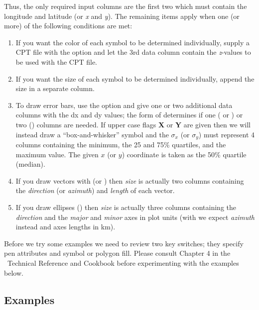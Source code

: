 \documentclass{report}
\begin{document}
Thus, the only required input columns are the first two which must contain the
longitude and latitude (or \emph{x} and \emph{y}).  The remaining items
apply when one (or more) of the following conditions are met:

\begin{enumerate}

\item If you want the color of each symbol to be determined individually,
supply a CPT file with the  option and let the 3rd data column
contain the \emph{z}-values to be used with the CPT file.

\item If you want the size of each symbol to be determined individually,
append the size in a separate column.

\item To draw error bars, use the  option and give one or two
additional data columns with the \PM dx and \PM dy values; the form of
 determines if one ( or ) or two ()
columns are needed.  If upper case flags \textbf{X} or \textbf{Y} are given then
we will instead draw a ``box-and-whisker'' symbol and the $\sigma_x$ (or
$\sigma_y$) must represent 4 columns containing the minimum, the 25 and 75\%
quartiles, and the maximum value.  The given $x$ (or $y$) coordinate is taken as the 50\%
quartile (median).

\item If you draw vectors with  (or ) then \emph{size} is
actually two columns containing the \emph{direction} (or \emph{azimuth})
and \emph{length} of each vector.

\item If you draw ellipses () then \emph{size} is actually three
columns containing the \emph{direction} and the \emph{major} and \emph{minor}
axes in plot units (with  we expect \emph{azimuth} instead and axes
lengths in km).

\end{enumerate}

Before we try some examples we need to review two key switches; they
specify pen attributes and symbol or polygon fill.  Please consult
Chapter 4 in the \GMT\ Technical Reference and Cookbook before experimenting
with the examples below.

\subsection{Examples}
\end{document}
